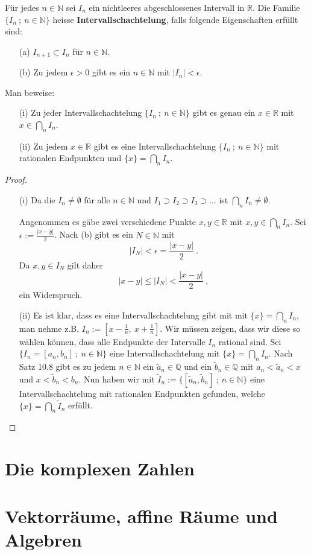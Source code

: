 \setcounter{aufgabe}{15}
\begin{aufgabe}
	Für jedes $n \in \mathbb N$ sei $I_n$ ein nichtleeres abgeschlossenes Intervall in 
	$\mathbb R$. Die Familie $\{ I_n \ ; \ n \in \mathbb N\}$ heisse
	\textbf{Intervallschachtelung}, falls folgende Eigenschaften erfüllt sind:
	\begin{enumerate}
		\item[(a)] $I_{n+1} \subset I_n$ für $n \in \mathbb N$.
		\item[(b)] Zu jedem $\epsilon > 0$ gibt es ein $n \in \mathbb N$ mit $|I_n| < \epsilon$.
	\end{enumerate}
	Man beweise:

	\begin{enumerate}
		\item[(i)] Zu jeder Intervallschachtelung $\{ I_n \ ; \ n \in \mathbb N \}$ gibt es genau
			ein $x \in \mathbb R$ mit $x \in \bigcap_n I_n$.
		\item[(ii)] Zu jedem $x \in \mathbb R$ gibt es eine Intervallschachtelung
			$\{I_n \ ; \ n \in \mathbb N\}$ mit rationalen Endpunkten und
			$\{x\} = \bigcap_n I_n$.
	\end{enumerate}
\end{aufgabe}
\begin{proof}
	\begin{enumerate}
	\item[(i)]
	Da die $I_n \neq \emptyset$ für alle $n \in \mathbb N$ und 
	$I_1 \supset I_2 \supset I_3 \supset \dots$ ist $\bigcap_n I_n \neq \emptyset$.

	Angenommen es gäbe zwei verschiedene Punkte $x, y \in \mathbb R$ mit 
	$x, y \in \bigcap_n I_n$. Sei $\epsilon := \frac{|x-y|}{2}$. Nach (b) gibt es
	ein $N \in \mathbb N$ mit 
	\[
		| I_N | < \epsilon = \frac{|x-y|}{2} \ .
	\]
	Da $x, y \in I_N$ gilt daher
	\[
		| x - y | \leq | I_N | < \frac{|x-y|}{2} \ ,
	\]
	ein Widerspruch.
	\item[(ii)] Es ist klar, dass es eine Intervallschachtelung gibt mit mit 
		$\{ x \} = \bigcap_n I_n$, man nehme z.B. $I_n := \left[ x-\frac 1 n, \ x + \frac 1 n \right]$.
		Wir müssen zeigen, dass wir diese so wählen können, dass alle Endpunkte der Intervalle
		$I_n$ rational sind. Sei $\{ I_n = [ a_n, b_n ] \ ; \ n \in \mathbb N \}$
		eine Intervallschachtelung mit $\{ x\} = \bigcap_n I_n$.
		Nach Satz 10.8 gibt es zu jedem $n \in \mathbb N$ ein $\tilde a_n \in \mathbb Q$ und ein 
		$\tilde b_n \in \mathbb Q$ mit $a_n < \tilde a_n < x$ und $x < \tilde b_n < b_n$.
		Nun haben wir mit $\tilde I_n := \{ [ \tilde a_n, \tilde b_n ] \ ; \ n \in \mathbb N\}$
		eine Intervallschachtelung mit rationalen Endpunkten gefunden, 
		welche $\{ x \} = \bigcap_n \tilde I_n$ erfüllt.
	\end{enumerate}
\end{proof}

\section{Die komplexen Zahlen}
\section{Vektorräume, affine Räume und Algebren}

